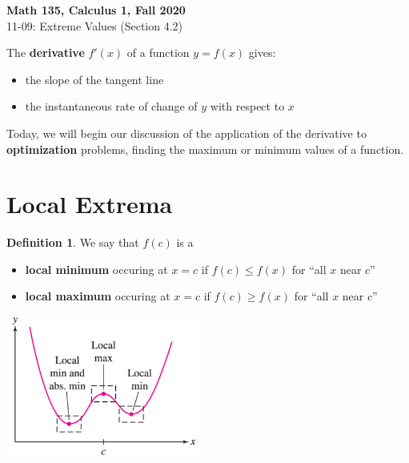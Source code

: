\documentclass[11pt,reqno,final]{amsart}
\numberwithin{figure}{section}
\theoremstyle{definition} %
\newtheorem{definition}[equation]{Definition}%
\begin{document}
\begin{center}
        \textbf{\Large Math 135, Calculus 1, Fall 2020}\\[10pt]
        {\large 11-09: Extreme Values (Section 4.2)}
\end{center}

\thispagestyle{empty}


\renewcommand{\thesection}{\Alph{section}}


The \textbf{derivative} $f'(x)$ of a function $y=f(x)$ gives:
\begin{itemize}
\item the slope of the tangent line
\item the instantaneous rate of change of $y$ with respect to $x$
\end{itemize}

Today, we will begin our discussion of the application of the derivative to \textbf{optimization} problems, finding the maximum or minimum values of a function. 

\section{Local Extrema}

\begin{definition}
        We say that $f(c)$ is a
        \begin{itemize}
        \item \textbf{local minimum} occuring at $x = c$ if $f(c) \leq f(x)$ for ``all $x$ near $c$''
        \item \textbf{local maximum} occuring at $x = c$ if $f(c) \geq f(x)$ for ``all $x$ near $c$''
        \end{itemize}
        \begin{center}
                \includegraphics[width=2.5in]{11-09P_locminmax.png}
        \end{center}
\end{definition}
\end{document}

